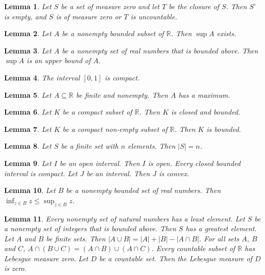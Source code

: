 \documentclass{article}
\newtheorem{lemma}{Lemma}
\begin{document}
\begin{lemma}\label{zero}
Let $S$ be a set of measure zero and let $T$ be the closure of $S$. Then $S^\circ$ is empty, and $S$ is of measure zero or $T$ is uncountable.
\end{lemma}

\begin{lemma}\label{sup-exists}
Let $A$ be a nonempty bounded subset of $\mathbb{R}$. Then $\sup A$ exists.
\end{lemma}

\begin{lemma}\label{sup-upper-bound}
Let $A$ be a nonempty set of real numbers that is bounded above. Then $\sup A$ is an upper bound of $A$.
\end{lemma}

\begin{lemma}\label{interval-compact}
The interval $[0,1]$ is compact.
\end{lemma}

\begin{lemma}\label{finite-maximum}
Let $A\subseteq\mathbb{R}$ be finite and nonempty. Then $A$ has a maximum.
\end{lemma}

\begin{lemma}\label{heine-borel}
Let $K$ be a compact subset of $\mathbb{R}$. Then $K$ is closed and bounded.
\end{lemma}

\begin{lemma}\label{non-empty-compact}
Let $K$ be a compact non-empty subset of $\mathbb{R}$. Then $K$ is bounded.
\end{lemma}

\begin{lemma}\label{set-elements}
Let $S$ be a finite set with $n$ elements. Then $|S|=n$.
\end{lemma}

\begin{lemma}\label{intervals}
Let $I$ be an open interval. Then $I$ is open. Every closed bounded interval is compact. Let $J$ be an interval. Then $J$ is convex.
\end{lemma}

\begin{lemma}\label{infimum}
Let $B$ be a nonempty bounded set of real numbers. Then $\inf_{z\in B}z\le\sup_{z\in B}z$.
\end{lemma}

\begin{lemma}\label{finite-sets}
Every nonempty set of natural numbers has a least element. Let $S$ be a nonempty set of integers that is bounded above. Then $S$ has a greatest element. Let $A$ and $B$ be finite sets. Then $|A\cup B|=|A|+|B|-|A\cap B|$. For all sets $A$, $B$ and $C$, $A\cap(B\cup C)=(A\cap B)\cup(A\cap C)$. Every countable subset of $\mathbb{R}$ has Lebesgue measure zero. Let $D$ be a countable set. Then the Lebesgue measure of $D$ is zero.
\end{lemma}
\end{document}
